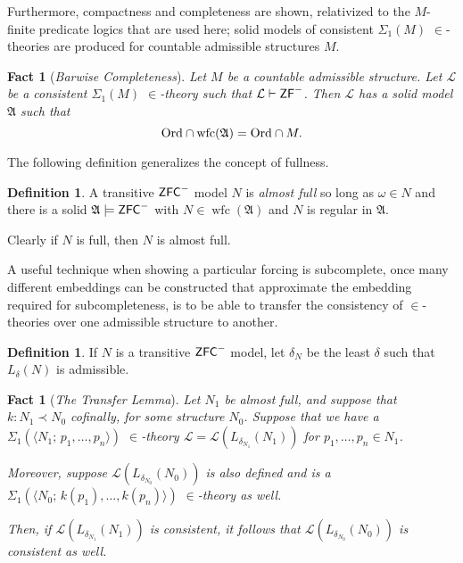 \documentclass{amsart}
\newtheorem{fact}[theorem]{Fact}
\theoremstyle{definition}
\newtheorem{definition}[theorem]{Definition}
\theoremstyle{remark}
\newcommand{\N}{{\overline{N}}}
\newcommand{\ZFC}{\textup{\ensuremath{\textsf{ZFC}}}}
\newcommand{\Ord}{\textup{\ensuremath{\text{Ord}}}}
\DeclareMathOperator{\wfc}{wfc}
\begin{document}
Furthermore, compactness and completeness are shown, relativized to the $M$-finite predicate logics that are used here; solid models of consistent $\Sigma_1(M)$ $\in$-theories are produced for countable admissible structures $M$. 

\begin{fact}[\emph{Barwise Completeness}] \label{fact:completeness} Let $M$ be a countable admissible structure. Let $\mathcal L$ be a consistent $\Sigma_1(M)$ $\in$-theory such that $\mathcal L \vdash \textsf{\textup{ZF}}^-$. Then $\mathcal L$ has a solid model $\mathfrak A$ such that $$\Ord \cap \wfc(\mathfrak A) = \Ord \cap M.$$ \end{fact}

The following definition generalizes the concept of fullness.
\begin{definition} A transitive $\ZFC^-$ model $N$ is \emph{almost full} so long as $\omega \in N$ and there is a solid $\mathfrak A \models \ZFC^-$ with $N \in \wfc(\mathfrak A)$ and $N$ is regular in $\mathfrak A$. \end{definition}
Clearly if $N$ is full, then $N$ is almost full.

A useful technique when showing a particular forcing is subcomplete, once many different embeddings can be constructed that approximate the embedding required for subcompleteness, is to be able to transfer the consistency of $\in$-theories over one admissible structure to another. 
\begin{definition} If $N$ is a transitive $\ZFC^-$ model, let $\delta_N$ be the least $\delta$ such that $L_\delta(N)$ is admissible. \end{definition}

%

\begin{fact}[\emph{The Transfer Lemma}]\label{fact:Transfer} Let $N_1$ be almost full, and suppose that $k: N_1 \prec N_0$ cofinally, for some structure $N_0$. Suppose that we have a $\Sigma_1(\langle N_1; \, p_1, \dots, p_n\rangle)$  $\in$-theory $\mathcal L=\mathcal L(L_{\delta_{N_1}}(N_1))$  for $p_1, \dots, p_n \in N_1$.

Moreover, suppose $\mathcal L(L_{\delta_{N_0}}(N_0))$ is also defined and is a $\Sigma_1(\langle N_0; \, k(p_1), \dots, k(p_n)\rangle)$ $\in$-theory as well. 

Then, 
if $\mathcal L(L_{\delta_{N_1}}(N_1))$ is consistent, it follows that $\mathcal L(L_{\delta_{N_0}}(N_0))$ is consistent as well. \end{fact} 
\end{document}
